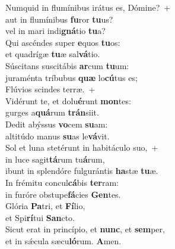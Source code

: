 \evenverse Numquid in flumínibus irátus es, Dómine?~+\\\evenverse  aut in flumínibus \textbf{fu}ror \textbf{tu}us?~\*\\
\evenverse vel in mari indi\textbf{gná}tio \textbf{tu}a?\\
\oddverse Qui ascéndes super \textbf{e}quos \textbf{tu}os:~\*\\
\oddverse et quadrígæ \textbf{tu}æ sal\textbf{vá}tio.\\
\evenverse Súscitans suscitábis \textbf{ar}cum \textbf{tu}um:~\*\\
\evenverse juraménta tríbubus \textbf{quæ} lo\textbf{cú}tus es;\\
\oddverse Flúvios scindes terræ.~+\\
\oddverse  Vidérunt te, et dolu\textbf{é}runt \textbf{mon}tes:~\*\\
\oddverse gurges a\textbf{quá}rum \textbf{trán}siit.\\
\evenverse Dedit abýssus \textbf{vo}cem \textbf{su}am:~\*\\
\evenverse altitúdo manus \textbf{su}as le\textbf{vá}vit.\\
\oddverse Sol et luna stetérunt in habitáculo suo,~+\\
\oddverse  in luce sagit\textbf{tá}rum tu\textbf{á}rum,~\*\\
\oddverse ibunt in splendóre fulgurántis \textbf{ha}stæ \textbf{tu}æ.\\
\evenverse In frémitu concul\textbf{cá}bis \textbf{ter}ram:~\*\\
\evenverse in furóre obstupe\textbf{fá}cies \textbf{Gen}tes.\\
\oddverse Glória \textbf{Pa}tri, et \textbf{Fí}lio,~\*\\
\oddverse et Spi\textbf{rí}tui \textbf{San}cto.\\
\evenverse Sicut erat in princípio, et \textbf{nunc}, et \textbf{sem}per,~\*\\
\evenverse et in sǽcula sæcu\textbf{ló}rum. \textbf{A}men.\\
